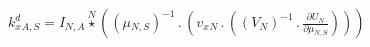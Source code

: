 \documentclass[border=2pt]{standalone}
\begin{document}
${{k^d_x}}{_{A, S}}={{I}}{_{N, A}} \stackrel{N}{\star} \left(\left( {{\mu}}{_{N, S}} \right)^{-1} \, . \, \left({{v_x}}{_{N}} \, . \, \left(\left( {V}{_{N}} \right)^{-1} \, . \, \frac{\partial{{U}{_{N}}}}{\partial{{{\mu}}{_{N, S}}}}\right)\right)\right)$
\end{document}
